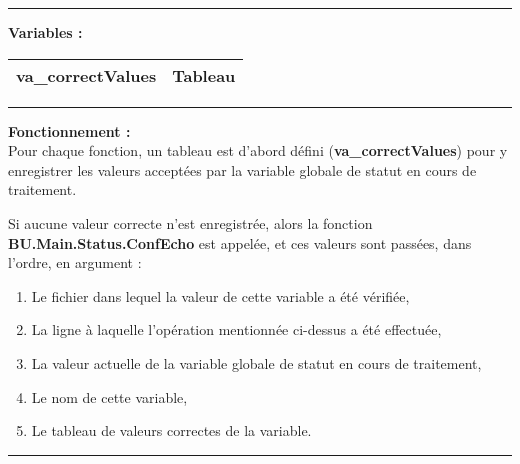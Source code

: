 \documentclass[a4paper,10pt]{article}
\begin{document}
    \setlength{\parskip}{2em}


    \par\noindent\rule{\textwidth}{0.4pt}\setlength{\parskip}{1em}

    \begin{justify}
        \textbf{Variables :}

        \begin{tabular}{|l|l|}
            \hline
            \textbf{\color{vars}va\_correctValues} & Tableau\\
            \hline
        \end{tabular}
    \end{justify}\setlength{\parskip}{1em}


    \par\noindent\rule{\textwidth}{0.4pt}

    \begin{justify}
        \textbf{Fonctionnement :}\\[1\baselineskip]
        Pour chaque fonction, un tableau est d'abord défini (\textbf{\color{vars}va\_correctValues}) pour y enregistrer les valeurs acceptées par la variable globale de statut en cours de traitement.
    \end{justify}

    \begin{justify}
        Si aucune valeur correcte n'est enregistrée, alors la fonction \textbf{\color{func}BU.Main.Status.ConfEcho} est appelée, et ces valeurs sont passées, dans l'ordre, en argument :

        \begin{enumerate}
            \item Le fichier dans lequel la valeur de cette variable a été vérifiée,
            \item La ligne à laquelle l'opération mentionnée ci-dessus a été effectuée,
            \item La valeur actuelle de la variable globale de statut en cours de traitement,
            \item Le nom de cette variable,
            \item Le tableau de valeurs correctes de la variable.
        \end{enumerate}
    \end{justify}


    \par\noindent\rule{\textwidth}{0.4pt}
\end{document}
